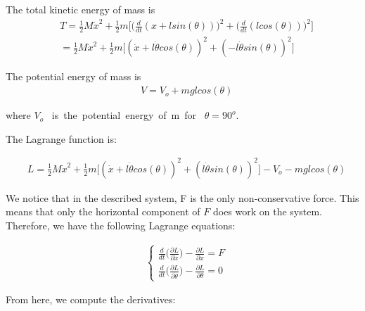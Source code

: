 \documentclass [12pt,letterpaper]{exam}
\begin{document}
The total kinetic energy of mass is
\begin{align} 
& T = \frac{1}{2}M\dot{x}^2 + \frac{1}{2}m\bigg[\bigg(\frac{d}{dt}(x + lsin(\theta))\bigg)^2 + \bigg(\frac{d}{dt}(lcos(\theta))\bigg)^2\bigg] \\
& = \frac{1}{2}M\dot{x}^2 + \frac{1}{2}m\bigg[(\dot{x} + l\dot{\theta}cos(\theta))^2 + (-l\dot{\theta}sin(\theta))^2\bigg]
\end{align}

The potential energy of mass is
\begin{align} 
& V = V_o + mglcos(\theta)
\end{align}

where $V_o$ \mbox{ is the potential energy of m for } $\theta = 90^o$.

The Lagrange function is:

\begin{align}
& L = \frac{1}{2}M\dot{x}^2 + \frac{1}{2}m\big[(\dot{x} + l\dot{\theta}cos(\theta))^2 + (l\dot{\theta}sin(\theta))^2\big] - V_o - mglcos(\theta)
\end{align}

We notice that in the described system, F is the only non-conservative force. This means that only the horizontal component of $F$ does work on the system. Therefore, we have the following Lagrange equations:

\begin{align}
& \begin{cases} \frac{d}{dt}\bigg(\frac{\partial L}{\partial \dot{x}}\bigg) - \frac{\partial L}{\partial x} = F \\
\frac{d}{dt}\bigg(\frac{\partial L}{\partial \dot{\theta}}\bigg) - \frac{\partial L}{\partial \theta} = 0
\end{cases}
\end{align}

From here, we compute the derivatives:
\end{document}
